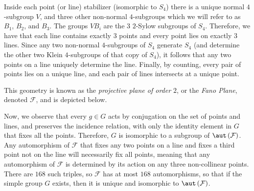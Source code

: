 \documentclass[10pt]{mypackage}
\begin{document}
Inside each point (or line) stabilizer (isomorphic to $S_4$) there is a unique normal $4$-subgroup $V$, and three other non-normal $4$-subgroups which we will refer to as $B_1$, $B_2$, and $B_3$. The groups $VB_i$ are the $3$ $2$-Sylow subgroups of $S_4$. Therefore, we have that each line contains exactly $3$ points and every point lies on exactly $3$ lines. Since any two non-normal $4$-subgroups of $S_4$ generate $S_4$ (and determine the other two Klein $4$-subgroups of that copy of $S_4$), it follows that any two points on a line uniquely determine the line. Finally, by counting, every pair of points lies on a unique line, and each pair of lines intersects at a unique point.

This geometry is known as the \textit{projective plane of order $2$}, or the \textit{Fano Plane}, denoted $\mathcal{F}$, and is depicted below.
\begin{center}
\end{center}
Now, we observe that every $g\in G$ acts by conjugation on the set of points and lines, and preserves the incidence relation, with only the identity element in $G$ that fixes all the points. Therefore, $G$ is isomorphic to a subgroup of $\aut\left( \mathcal{F} \right)$. Any automorphism of $\mathcal{F}$ that fixes any two points on a line and fixes a third point not on the line will necessarily fix all points, meaning that any automorphism of $\mathcal{F}$ is determined by its action on any three non-collinear points. There are $168$ such triples, so $\mathcal{F}$ has at most $168$ automorphisms, so that if the simple group $G$ exists, then it is unique and isomorphic to $\aut\left( \mathcal{F} \right)$.
\end{document}
